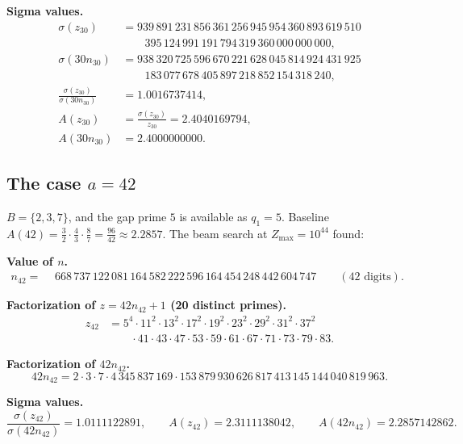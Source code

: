 \documentclass[12pt]{amsart}
\theoremstyle{definition}
\begin{document}
\medskip
\noindent
\textbf{Sigma values.}
\begin{align*}
\sigma(z_{30})
  &= 939\,891\,231\,856\,361\,256\,945\,954\,360\,893\,619\,510\\
  &\qquad 395\,124\,991\,191\,794\,319\,360\,000\,000\,000,\\[2pt]
\sigma(30n_{30})
  &= 938\,320\,725\,596\,670\,221\,628\,045\,814\,924\,431\,925\\
  &\qquad 183\,077\,678\,405\,897\,218\,852\,154\,318\,240,\\[4pt]
\frac{\sigma(z_{30})}{\sigma(30n_{30})}
  &= 1.0016737414,\\[4pt]
A(z_{30})
  &= \frac{\sigma(z_{30})}{z_{30}} = 2.4040169794,\\
A(30n_{30})
  &= 2.4000000000 .
\end{align*}

\subsection{The case $a = 42$}

$B = \{2,3,7\}$, and the gap prime $5$ is available as $q_1 = 5$.
Baseline $A(42) = \frac{3}{2}\cdot\frac{4}{3}\cdot\frac{8}{7}
= \frac{96}{42} \approx 2.2857$.
The beam search at $Z_{\max} = 10^{44}$ found:

\medskip
\noindent
\textbf{Value of $n$.}
\[
n_{42}=
\begin{aligned}
&668\,737\,122\,081\,164\,582\,222\,596\,164\,454\,248\,442\,604\,747
\qquad (\text{42 digits}).
\end{aligned}
\]

\medskip
\noindent
\textbf{Factorization of $z = 42n_{42}+1$ (20 distinct primes).}
\begin{align*}
z_{42} &= 5^{4} \cdot 11^{2} \cdot 13^{2} \cdot 17^{2} \cdot 19^{2}
          \cdot 23^{2} \cdot 29^{2} \cdot 31^{2} \cdot 37^{2} \\
       &\qquad \cdot 41 \cdot 43 \cdot 47 \cdot 53 \cdot 59 \cdot 61
          \cdot 67 \cdot 71 \cdot 73 \cdot 79 \cdot 83 .
\end{align*}

\medskip
\noindent
\textbf{Factorization of $42n_{42}$.}
\[
42n_{42} = 2 \cdot 3 \cdot 7
           \cdot 4\,345\,837\,169
           \cdot 153\,879\,930\,626\,817\,413\,145\,144\,040\,819\,963 .
\]

\medskip
\noindent
\textbf{Sigma values.}
\[
\frac{\sigma(z_{42})}{\sigma(42n_{42})} = 1.0111122891,\qquad
A(z_{42}) = 2.3111138042,\qquad
A(42n_{42}) = 2.2857142862 .
\]
\end{document}
